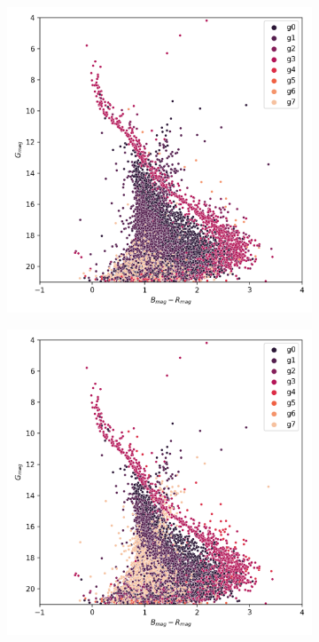 \documentclass[11pt,a4paper,english,twocolumn]{article}
\begin{document}
\begin{figure}[!hbt]
  \begin{subfigure}{0.3\textwidth}
    \includegraphics[width=\textwidth]{../figures/ngc_2516/kmeans_hr_diagram_ngc_2516.png}
  \end{subfigure}
  \begin{subfigure}{0.3\textwidth}
    \includegraphics[width=\textwidth]{../figures/ngc_2516/dec_hr_diagram_ngc_2516.png}

\end{subfigure}
\end{figure}
\end{document}
